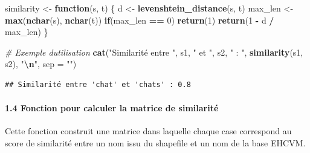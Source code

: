 \documentclass[
]{article}
\newenvironment{Shaded}{\begin{snugshade}}{\end{snugshade}}
\newcommand{\AttributeTok}[1]{\textcolor[rgb]{0.13,0.29,0.53}{#1}}
\newcommand{\CommentTok}[1]{\textcolor[rgb]{0.56,0.35,0.01}{\textit{#1}}}
\newcommand{\ControlFlowTok}[1]{\textcolor[rgb]{0.13,0.29,0.53}{\textbf{#1}}}
\newcommand{\DecValTok}[1]{\textcolor[rgb]{0.00,0.00,0.81}{#1}}
\newcommand{\FunctionTok}[1]{\textcolor[rgb]{0.13,0.29,0.53}{\textbf{#1}}}
\newcommand{\NormalTok}[1]{#1}
\newcommand{\OtherTok}[1]{\textcolor[rgb]{0.56,0.35,0.01}{#1}}
\newcommand{\SpecialCharTok}[1]{\textcolor[rgb]{0.81,0.36,0.00}{\textbf{#1}}}
\newcommand{\StringTok}[1]{\textcolor[rgb]{0.31,0.60,0.02}{#1}}
\begin{document}
\begin{Shaded}
\begin{Highlighting}[]
\NormalTok{similarity }\OtherTok{\textless{}{-}} \ControlFlowTok{function}\NormalTok{(s, t) \{}
\NormalTok{  d }\OtherTok{\textless{}{-}} \FunctionTok{levenshtein\_distance}\NormalTok{(s, t)}
\NormalTok{  max\_len }\OtherTok{\textless{}{-}} \FunctionTok{max}\NormalTok{(}\FunctionTok{nchar}\NormalTok{(s), }\FunctionTok{nchar}\NormalTok{(t))}
  \ControlFlowTok{if}\NormalTok{(max\_len }\SpecialCharTok{==} \DecValTok{0}\NormalTok{) }\FunctionTok{return}\NormalTok{(}\DecValTok{1}\NormalTok{)}
  \FunctionTok{return}\NormalTok{(}\DecValTok{1} \SpecialCharTok{{-}}\NormalTok{ d }\SpecialCharTok{/}\NormalTok{ max\_len)}
\NormalTok{\}}

\CommentTok{\# Exemple d\textquotesingle{}utilisation}
\FunctionTok{cat}\NormalTok{(}\StringTok{"Similarité entre \textquotesingle{}"}\NormalTok{, s1, }\StringTok{"\textquotesingle{} et \textquotesingle{}"}\NormalTok{, s2, }\StringTok{"\textquotesingle{} : "}\NormalTok{, }
    \FunctionTok{similarity}\NormalTok{(s1, s2), }\StringTok{"}\SpecialCharTok{\textbackslash{}n}\StringTok{"}\NormalTok{, }\AttributeTok{sep =} \StringTok{""}\NormalTok{)}
\end{Highlighting}
\end{Shaded}

\begin{verbatim}
## Similarité entre 'chat' et 'chats' : 0.8
\end{verbatim}

\hypertarget{fonction-pour-calculer-la-matrice-de-similarituxe9}{%
\paragraph{1.4 Fonction pour calculer la matrice de
similarité}\label{fonction-pour-calculer-la-matrice-de-similarituxe9}}

Cette fonction construit une matrice dans laquelle chaque case
correspond au score de similarité entre un nom issu du shapefile et un
nom de la base EHCVM.
\end{document}
